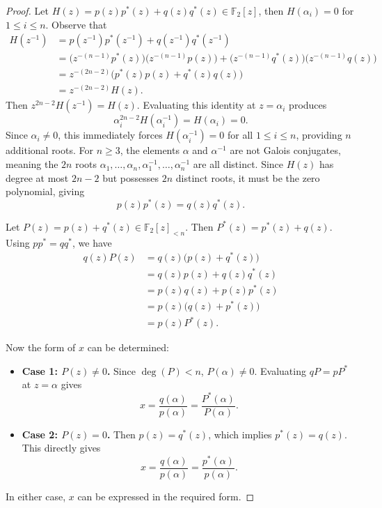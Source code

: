 \documentclass[hidelinks,onefignum,onetabnum]{siamart251216}
\theoremstyle{definition}
\theoremstyle{remark}
\begin{document}
\begin{proof}
	Let $H(z) = p(z)p^*(z) + q(z)q^*(z) \in \mathbb{F}_2[z]$, then $H(\alpha_i) = 0$ for $1 \le i \le n$. Observe that
	\begin{align*}
		H(z^{-1}) &= p(z^{-1})p^*(z^{-1}) + q(z^{-1})q^*(z^{-1}) \\
		&= \big(z^{-(n-1)} p^*(z)\big)\big(z^{-(n-1)} p(z)\big) + \big(z^{-(n-1)} q^*(z)\big)\big(z^{-(n-1)} q(z)\big) \\
		&= z^{-(2n-2)} \big( p^*(z)p(z) + q^*(z)q(z) \big) \\
		&= z^{-(2n-2)} H(z).
	\end{align*}
	Then $z^{2n-2}H(z^{-1}) = H(z)$. Evaluating this identity at $z = \alpha_i$ produces
	\begin{equation}
		\alpha_i^{2n-2} H(\alpha_i^{-1}) = H(\alpha_i) = 0.
	\end{equation}
	Since $\alpha_i \neq 0$, this immediately forces $H(\alpha_i^{-1}) = 0$ for all $1 \le i \le n$, providing $n$ additional roots. For $n \ge 3$, the elements $\alpha$ and $\alpha^{-1}$ are not Galois conjugates, meaning the $2n$ roots $\alpha_1, \dots, \alpha_n, \alpha_1^{-1}, \dots, \alpha_n^{-1}$ are all distinct. Since $H(z)$ has degree at most $2n-2$ but possesses $2n$ distinct roots, it must be the zero polynomial, giving
	\begin{equation}
		\label{eq:pp_qq}
		p(z)p^*(z) = q(z)q^*(z).
	\end{equation}
	
	Let $P(z) = p(z) + q^*(z) \in \mathbb{F}_2[z]_{<n}$. Then $P^*(z) = p^*(z) + q(z)$. Using $pp^* = qq^*$, we have
	\begin{align*}
		q(z)P(z) &= q(z)\big(p(z) + q^*(z)\big) \\
		&= q(z)p(z) + q(z)q^*(z) \\
		&= p(z)q(z) + p(z)p^*(z)\\
		&= p(z)\big(q(z) + p^*(z)\big)\\
		&= p(z)P^*(z).
	\end{align*}
	
	Now the form of $x $ can be determined:
	
	\begin{itemize}
		\item \textbf{Case 1: $P(z) \neq 0$.} Since $\deg(P) < n$, $P(\alpha) \neq 0$. Evaluating $qP = pP^*$ at $z = \alpha$ gives
		\[
		x = \frac{q(\alpha)}{p(\alpha)} = \frac{P^*(\alpha)}{P(\alpha)}.
		\]
		
		\item \textbf{Case 2: $P(z) = 0$.} Then $p(z) = q^*(z)$, which implies $p^*(z) = q(z)$. This directly gives
		\[
		x = \frac{q(\alpha)}{p(\alpha)} = \frac{p^*(\alpha)}{p(\alpha)}.
		\]
	\end{itemize}
	In either case, $x$ can be expressed in the required form.
\end{proof}
\end{document}
